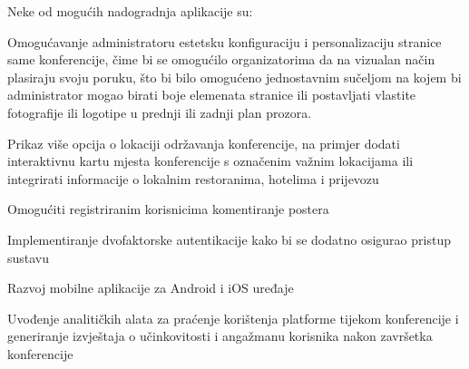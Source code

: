 		
		Neke od mogućih nadogradnja aplikacije su: 
		\begin{packed_item}
			\item Omogućavanje administratoru estetsku konfiguraciju i personalizaciju stranice same konferencije, čime bi se omogućilo organizatorima da na vizualan način plasiraju svoju poruku, što bi bilo omogućeno jednostavnim sučeljom na kojem bi administrator mogao birati boje elemenata stranice ili postavljati vlastite fotografije ili logotipe u prednji ili zadnji plan prozora.
			\item Prikaz više opcija o lokaciji održavanja konferencije, na primjer dodati  interaktivnu kartu mjesta konferencije s označenim važnim lokacijama ili integrirati informacije o lokalnim restoranima, hotelima i prijevozu
			 \item Omogućiti registriranim korisnicima komentiranje postera
			 \item Implementiranje dvofaktorske autentikacije kako bi se dodatno osigurao pristup sustavu
			 \item Razvoj mobilne aplikacije za Android i iOS uređaje 
			 \item Uvođenje analitičkih alata za praćenje korištenja platforme tijekom konferencije i generiranje izvještaja o učinkovitosti i angažmanu korisnika nakon završetka konferencije
		\end{packed_item}

		\eject
		
